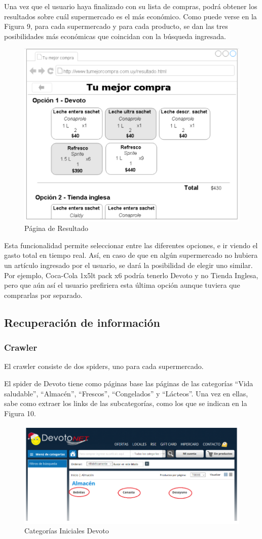 \documentclass[12pt]{article} %
\begin{document}
Una vez que el usuario haya finalizado con su lista de compras, podrá obtener los resultados sobre cuál supermercado es el más económico. Como puede verse en la Figura 9, para cada supermercado y para cada producto, se dan las tres posibilidades más económicas que coincidan con la búsqueda ingresada.

\begin{figure}[H]
\includegraphics[height=0.30\textwidth]{pag_resultado}
\centering
\caption{Página de Resultado}
\end{figure}

Esta funcionalidad permite seleccionar entre las diferentes opciones, e ir viendo el gasto total en tiempo real. Así, en caso de que en algún supermercado no hubiera un artículo ingresado por el usuario, se dará la posibilidad de elegir uno similar. Por ejemplo, Coca-Cola 1x5lt pack x6 podría tenerlo Devoto y no Tienda Inglesa, pero que aún así el usuario prefiriera esta última opción aunque tuviera que comprarlas por separado.


\subsection{Recuperación de información}

\subsubsection{Crawler}

El crawler consiste de dos spiders, uno para cada supermercado.

El spider de Devoto tiene como páginas base las páginas de las categorías “Vida saludable”, “Almacén”, “Frescos”, “Congelados” y “Lácteos”. Una vez en ellas, sabe como extraer los links de las subcategorías, como los que se indican en la Figura 10.

\begin{figure}[H]
\includegraphics[height=0.30\textwidth]{pag_devoto}
\centering
\caption{Categorías Iniciales Devoto}
\end{figure}
\end{document}
